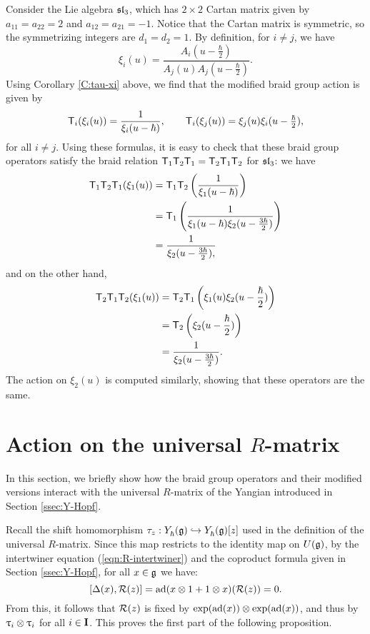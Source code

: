 \begin{example}\label{E:sl3-mbraid-action}
    Consider the Lie algebra $\mfsl_3$, which has $2\times 2$ Cartan matrix given by $a_{11}=a_{22}=2$ and $a_{12}=a_{21}=-1$.
    Notice that the Cartan matrix is symmetric, so the symmetrizing integers are $d_1=d_2=1$.
    By definition, for $i\neq j$, we have
    \[\xi_i(u) = \frac{A_i(u-\frac{\hbar}{2})}{A_j(u)A_j(u-\frac{\hbar}{2})}.\]
    Using Corollary \ref{C:tau-xi} above, we find that the modified braid group action is given by
    \[\mbraid_i(\xi_i(u)) = \frac{1}{\xi_i(u-\hbar)}, \qquad
    \mbraid_i(\xi_j(u)) = \xi_j(u)\xi_i(u-\tfrac{\hbar}{2}),\]
    for all $i\neq j$.
    Using these formulas, it is easy to check that these braid group operators satisfy the braid relation $\mbraid_1\mbraid_2\mbraid_1 = \mbraid_2\mbraid_1\mbraid_2$ for $\mfsl_3$: we have
    \begin{align*}
        \mbraid_1\mbraid_2\mbraid_1(\xi_1(u)) &= \mbraid_1\mbraid_2\left(\frac{1}{\xi_1(u-\hbar)}\right) \\
        &= \mbraid_1\left(\frac{1}{\xi_1(u-\hbar)\xi_2(u-\frac{3\hbar}{2})}\right) \\
        &= \frac{1}{\xi_2(u-\frac{3\hbar}{2}),}
    \end{align*}
    and on the other hand,
    \begin{align*}
        \mbraid_2\mbraid_1\mbraid_2(\xi_1(u)) &= \mbraid_2\mbraid_1\left(\xi_1(u)\xi_2(u-\frac{\hbar}{2})\right) \\
        &= \mbraid_2\left(\xi_2(u-\frac{\hbar}{2})\right) \\
        &= \frac{1}{\xi_2(u-\frac{3\hbar}{2})}.
    \end{align*}
    The action on $\xi_2(u)$ is computed similarly, showing that these operators are the same.
\end{example}


\section{Action on the universal \texorpdfstring{$R$}{R}-matrix}

In this section, we briefly show how the braid group operators and their modified versions interact with the universal $R$-matrix of the Yangian introduced in Section \ref{ssec:Y-Hopf}.

Recall the shift homomorphism $\tau_z:\Yhg\inj\Yhg[][z]$ used in the definition of the universal $R$-matrix.
Since this map restricts to the identity map on $\Ug$, by the intertwiner equation (\ref{eqn:R-intertwiner}) and the coproduct formula given in Section \ref{ssec:Y-Hopf}, for all $x\in\g$ we have:
\[[\Delta(x), \rmat(z)] = \ad(x\otimes 1 + 1\otimes x)(\rmat(z)) = 0.\]
From this, it follows that $\rmat(z)$ is fixed by $\exp(\ad(x))\otimes\exp(\ad(x))$, and thus by $\braid_i\otimes\braid_i$ for all $i\in\I$.
This proves the first part of the following proposition.

